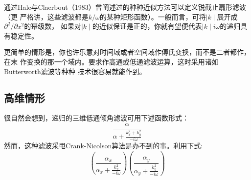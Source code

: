通过Hale与Claerbout（1983）曾阐述过的种种近似方法可以定义锐截止扇形滤波（更
严格讲，这些滤波都是$k/\omega$的某种矩形函数）。一般而言，可将$\mid k\mid$展开成$\partial^2/\partial x^2$的幂级数，
如果对$\mid k\mid$的近似保证是正的，你就有望便代表$\mid k\mid i\omega$的递归具有稳定性。

更简单的情形是，你也许乐意对时间域或者空间域作傅氏变换，而不是二者都作，在末
作变换的那一个域内。要求作高通或低通滤波运算，这时采用诸如Butterworth滤波等种种
技术很容易就能作到。

\subsection{高维情形}
\label{sec:2.5.5}

很自然会想到，递归的三维低通倾角滤波可用下述函数形式：
\begin{equation}
\frac{\alpha}{\alpha+\frac{k_x^2+k_y^2}{-i\omega}}
\label{eq:ex2.5.5}
\end{equation}
然而，这种滤波采甩Crank-Nicolson算法是办不到的事。利用下式:
\begin{equation}
(\frac{\alpha_x}{\alpha_x+\frac{k_x^2}{-i\omega}})(\frac{\alpha_y}{\alpha_y+\frac{k_y^2}{-i\omega}})
\label{eq:ex2.5.6}
\end{equation}
